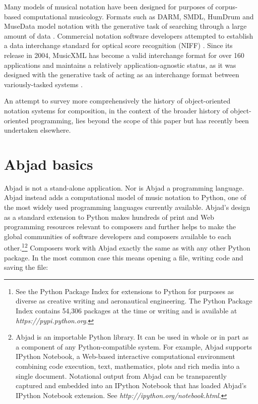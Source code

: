 \documentclass{article}
\begin{document}
Many models of musical notation have been designed for purposes of corpus-based
computational musicology. Formats such as DARM, SMDL, HumDrum and MuseData
model notation with the generative task of searching through a large amount of
data \cite{Selfridge-Field:1997ud}. Commercial notation software developers
attempted to establish a data interchange standard for optical score
recognition (NIFF) \cite{niff1995niff}. Since its release in 2004, MusicXML has
become a valid interchange format for over 160 applications and maintains a
relatively application-agnostic status, as it was designed with the generative
task of acting as an interchange format between variously-tasked systems
\cite{Good:2001if}.

An attempt to survey more comprehensively the
history of object-oriented notation systems for composition, in the context of
the broader history of object-oriented programming, lies beyond the scope of
this paper but has recently been undertaken
elsewhere\cite{trevino2013compositional}.

\section{Abjad basics} \label{sec:example}

Abjad is not a stand-alone application. Nor is Abjad a programming language.
Abjad instead adds a computational model of music notation to Python, one of the most widely used 
programming languages currently available. Abjad's design as a standard extension to Python makes hundreds of print and Web programming resources
relevant to composers and further helps to make the global communities of software developers and composers available to each other.\footnote{See the
Python Package Index for extensions to Python for purposes as diverse as
creative writing and aeronautical engineering. The Python Package Index
contains 54,306 packages at the time or writing and is available at
\textit{https://pypi.python.org}.}\footnote{Abjad is an importable Python
library. It can be used in whole or in part as a component of any
Python-compatible system. For example, Abjad supports IPython Notebook, a
Web-based interactive computational environment combining code execution, text,
mathematics, plots and rich media into a single document. Notational output
from Abjad can be transparently captured and embedded into an IPython Notebook
that has loaded Abjad's IPython Notebook extension. See
\textit{http://ipython.org/notebook.html}.}
Composers work with Abjad exactly
the same as with any other Python package. In the most common case this means opening a file, writing code and
saving the file:
\end{document}
